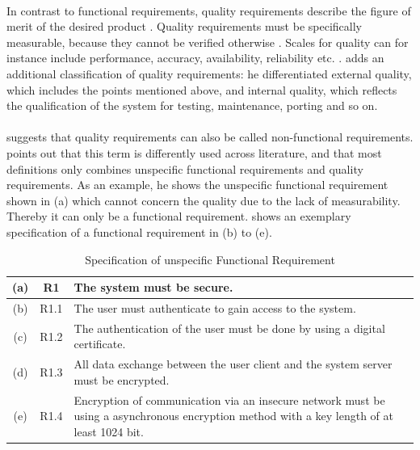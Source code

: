 \paragraph{} In contrast to functional requirements, quality requirements describe the figure of merit of the desired product \parencite[cf.][15]{Lauesen.2008}. Quality requirements must be specifically measurable, because they cannot be verified otherwise \parencite[cf.][371-371]{Lauesen.2008}. Scales for quality can for instance include performance, accuracy, availability, reliability etc. \parencite[cf.][15]{Pohl.2007}. \textcite[cf.][29]{Ebert.2014} adds an additional classification of quality requirements: he differentiated external quality, which includes the points mentioned above, and internal quality, which reflects the qualification of the system for testing, maintenance, porting and so on. 

\paragraph{} \textcite[cf.][15]{Lauesen.2008} suggests that quality requirements can also be called non-functional requirements. \textcite[cf.][16-17]{Pohl.2007} points out that this term is differently used across literature, and that most definitions only combines unspecific functional requirements and quality requirements. As an example, he shows the unspecific functional requirement shown in  (a) which cannot concern the quality due to the lack of measurability. Thereby it can only be a functional requirement. \textcite[17]{Pohl.2007} shows an exemplary specification of a  functional requirement in  (b) to (e).

\begin{table}[H]
    \centering
    \begin{tabular}{|c|c|m{10cm}|}
        \hline
        (a) & R1 & The system  must be secure.\\
         \hline
        \hline
        (b) & R1.1 & The user must authenticate to gain access to the system.\\
        \hline
        (c) & R1.2 & The authentication of the user must be done by using a digital certificate.\\
        \hline
        (d) & R1.3 & All data exchange between the user client and the system server must be encrypted.\\
        \hline
        (e) & R1.4 & Encryption of communication via an insecure network must be using a asynchronous encryption method with a key length of at least 1024 bit.\\
        \hline
    \end{tabular}
    \caption[Specification of unspecific Functional Requirement]{Specification of unspecific Functional Requirement \parencite[17]{Pohl.2007}}
    \label{tab:reqSpec}
\end{table}

